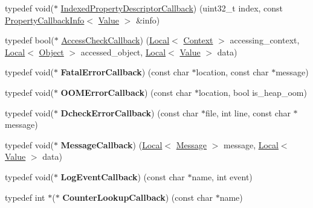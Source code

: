 \begin{DoxyCompactItemize}
typedef void($\ast$ \mbox{\hyperlink{namespacev8_a7506e91d70d885b5cbeabdf870ac0e88}{Indexed\+Property\+Descriptor\+Callback}}) (uint32\+\_\+t index, const \mbox{\hyperlink{classv8_1_1PropertyCallbackInfo}{Property\+Callback\+Info}}$<$ \mbox{\hyperlink{classv8_1_1Value}{Value}} $>$ \&info)
\item 
typedef bool($\ast$ \mbox{\hyperlink{namespacev8_a1024fb358d107c1494163217830688e6}{Access\+Check\+Callback}}) (\mbox{\hyperlink{classv8_1_1Local}{Local}}$<$ \mbox{\hyperlink{classv8_1_1Context}{Context}} $>$ accessing\+\_\+context, \mbox{\hyperlink{classv8_1_1Local}{Local}}$<$ \mbox{\hyperlink{classv8_1_1Object}{Object}} $>$ accessed\+\_\+object, \mbox{\hyperlink{classv8_1_1Local}{Local}}$<$ \mbox{\hyperlink{classv8_1_1Value}{Value}} $>$ data)
\item 
\mbox{\label{namespacev8_abc93f69508701f18dc5cc0ce165616aa}} 
typedef void($\ast$ {\bfseries Fatal\+Error\+Callback}) (const char $\ast$location, const char $\ast$message)
\item 
\mbox{\label{namespacev8_a994941ec59e9e6ecea8779629d95acb2}} 
typedef void($\ast$ {\bfseries O\+O\+M\+Error\+Callback}) (const char $\ast$location, bool is\+\_\+heap\+\_\+oom)
\item 
\mbox{\label{namespacev8_ad9a680b6a913265bf1105d399f167b53}} 
typedef void($\ast$ {\bfseries Dcheck\+Error\+Callback}) (const char $\ast$file, int line, const char $\ast$message)
\item 
\mbox{\label{namespacev8_a161bfe86d9970197e76b943b41285ba1}} 
typedef void($\ast$ {\bfseries Message\+Callback}) (\mbox{\hyperlink{classv8_1_1Local}{Local}}$<$ \mbox{\hyperlink{classv8_1_1Message}{Message}} $>$ message, \mbox{\hyperlink{classv8_1_1Local}{Local}}$<$ \mbox{\hyperlink{classv8_1_1Value}{Value}} $>$ data)
\item 
\mbox{\label{namespacev8_a1516c6948fdca41f79410b7ff91aeaf0}} 
typedef void($\ast$ {\bfseries Log\+Event\+Callback}) (const char $\ast$name, int event)
\item 
\mbox{\label{namespacev8_a5efca05a9f1f278a4eec832ce419104f}} 
typedef int $\ast$($\ast$ {\bfseries Counter\+Lookup\+Callback}) (const char $\ast$name)
\item 

\end{DoxyCompactItemize}

